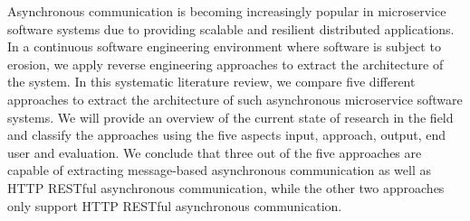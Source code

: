
Asynchronous communication is becoming increasingly popular in microservice software systems due to providing scalable and resilient distributed applications.
In a continuous software engineering environment where software is subject to erosion, we apply reverse engineering approaches to extract the architecture of the system.
In this systematic literature review, we compare five different approaches to extract the architecture of such asynchronous microservice software systems.
We will provide an overview of the current state of research in the field and classify the approaches using the five aspects input, approach, output, end user and evaluation.
We conclude that three out of the five approaches are capable of extracting message-based asynchronous communication as well as HTTP RESTful asynchronous communication, while the other two approaches only support HTTP RESTful asynchronous communication.